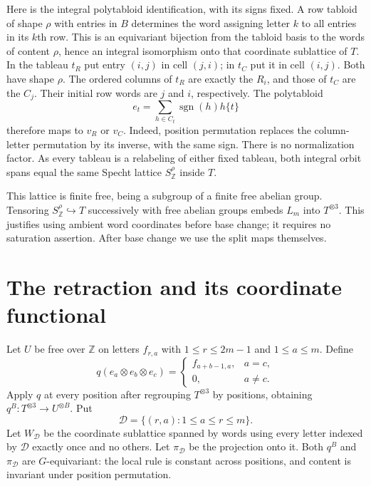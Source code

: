\documentclass[11pt]{article}
\newcommand{\Z}{\mathbb Z}
\newcommand{\sgn}{\operatorname{sgn}}
\numberwithin{equation}{section}
\begin{document}
Here is the integral polytabloid identification, with its signs fixed. A row tabloid of shape $\rho$ with entries in $B$ determines the word assigning letter $k$ to all entries in its $k$th row. This is an equivariant bijection from the tabloid basis to the words of content $\rho$, hence an integral isomorphism onto that coordinate sublattice of $T$. In the tableau $t_R$ put entry $(i,j)$ in cell $(j,i)$; in $t_C$ put it in cell $(i,j)$. Both have shape $\rho$. The ordered columns of $t_R$ are exactly the $R_i$, and those of $t_C$ are the $C_j$. Their initial row words are $j$ and $i$, respectively. The polytabloid
\[
 e_t=\sum_{h\in C_t}\sgn(h)h\{t\}
\]
therefore maps to $v_R$ or $v_C$. Indeed, position permutation replaces the column-letter permutation by its inverse, with the same sign. There is no normalization factor. As every tableau is a relabeling of either fixed tableau, both integral orbit spans equal the same Specht lattice $S^\rho_{\Z}$ inside $T$.

This lattice is finite free, being a subgroup of a finite free abelian group. Tensoring $S^\rho_{\Z}\hookrightarrow T$ successively with free abelian groups embeds $L_m$ into $T^{\otimes3}$. This justifies using ambient word coordinates before base change; it requires no saturation assertion. After base change we use the split maps themselves.

\section{The retraction and its coordinate functional}\label{sec:map}
Let $U$ be free over $\Z$ on letters $f_{r,a}$ with $1\le r\le2m-1$ and $1\le a\le m$. Define
\begin{equation}\label{eq:q}
 q(e_a\otimes e_b\otimes e_c)=
 \begin{cases}f_{a+b-1,a},&a=c,\\0,&a\ne c.\end{cases}
\end{equation}
Apply $q$ at every position after regrouping $T^{\otimes3}$ by positions, obtaining $q^B:T^{\otimes3}\to U^{\otimes B}$. Put
\[
 \mathcal D=\{(r,a):1\le a\le r\le m\}.
\]
Let $W_{\mathcal D}$ be the coordinate sublattice spanned by words using every letter indexed by $\mathcal D$ exactly once and no others. Let $\pi_{\mathcal D}$ be the projection onto it. Both $q^B$ and $\pi_{\mathcal D}$ are $G$-equivariant: the local rule is constant across positions, and content is invariant under position permutation.
\end{document}

